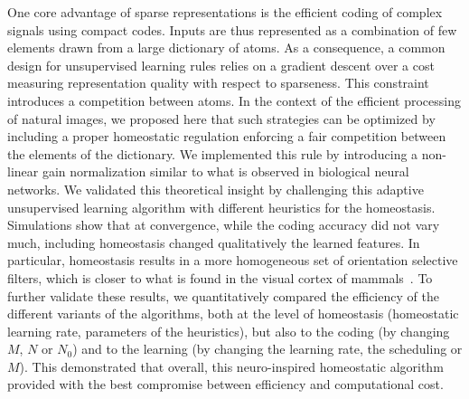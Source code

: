 \documentclass[vision,article,submit,oneauthor,pdftex]{Definitions/mdpi}
\begin{document}
One core advantage of sparse representations is the efficient coding of complex signals using compact codes. Inputs are thus represented as a combination of few elements drawn from a large dictionary of atoms. As a consequence, a common design for unsupervised learning rules relies on a gradient descent over a cost measuring representation quality with respect to sparseness. This constraint introduces a competition between atoms. In the context of the efficient processing of natural images, we proposed here that such strategies can be optimized by including a proper homeostatic regulation enforcing a fair competition between the elements of the dictionary. We implemented this rule by introducing a non-linear gain normalization similar to what is observed in biological neural networks. We validated this theoretical insight by challenging this adaptive unsupervised learning algorithm with different heuristics for the homeostasis. Simulations show that at convergence, while the coding accuracy did not vary much, including homeostasis changed qualitatively the learned features. In particular, homeostasis results in a more homogeneous set of orientation selective filters, which is closer to what is found in the visual cortex of mammals~\citep{Ringach02,Rehn07,Loxley17}. To further validate these results, we quantitatively compared the efficiency of the different variants of the algorithms, both at the level of homeostasis (homeostatic learning rate, parameters of the heuristics), but also to the coding (by changing $M$, $N$ or $N_0$) and to the learning (by changing the learning rate, the scheduling or $M$). This demonstrated that overall, this neuro-inspired homeostatic algorithm provided with the best compromise between efficiency and computational cost.
\end{document}

